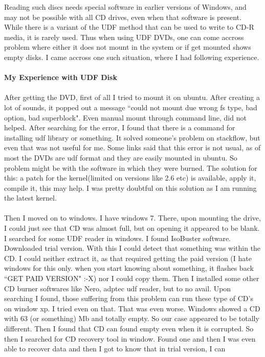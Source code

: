 Reading such discs needs special software in earlier versions of Windows, and may not be possible with all CD drives, even when that software is present.\\
While there is a variant of the UDF method that can be used to write to CD-R media, it is rarely used. Thus when using UDF DVDs, one can come accross problem where either it does not mount in the system or if get mounted shows empty disks. I came accross one such situation, where I had following experience.\\\\
{\bf My Experience with UDF Disk}\\\\
After getting the DVD, first of all I tried to mount it on ubuntu. After creating a lot of sounds, it popped out a message ``could not mount due wrong fs type, bad option, bad superblock". Even manual mount through command line, did not helped. After searching for the error, I found that there is a command for installing udf library or something. It solved someone's problem on stackflow, but even that was not useful for me. Some links said that this error is not usual, as of most the DVDs are udf format and they are easily mounted in ubuntu. So problem might be with the software in which they were burned. The solution for this: a patch for the kernel(limited on versions like 2.6 etc) is available, apply it, compile it, this may help. I was pretty doubtful on this solution as I am running the latest kernel.\\\\
Then I moved on to windows. I have windows 7. There, upon mounting the drive, I could just see that CD was almost full, but on opening it appeared to be blank. I searched for some UDF reader in windows. I found IsoBuster software. Downloaded trial version. With this I could
detect that something was within the CD. I could neither extract it, as that required getting the paid version (I hate windows for this
only. when you start knowing about something, it flashes back ``GET PAID VERSION" :-X) nor I could copy them. Then I installed some other
CD burner softwares like Nero, adptec udf reader, but to no avail. Upon searching I found, those suffering from this problem can run
these type of CD's on window xp. I tried even on that. That was even worse. Windows showed a CD with 63 (or something) Mb and totally
empty. So our case appeared to be totally different. Then I found that CD can found empty even when it is corrupted. So then I searched for
CD recovery tool in window. Found one and then I was even able to recover data and then I got to know that in trial version, I can
